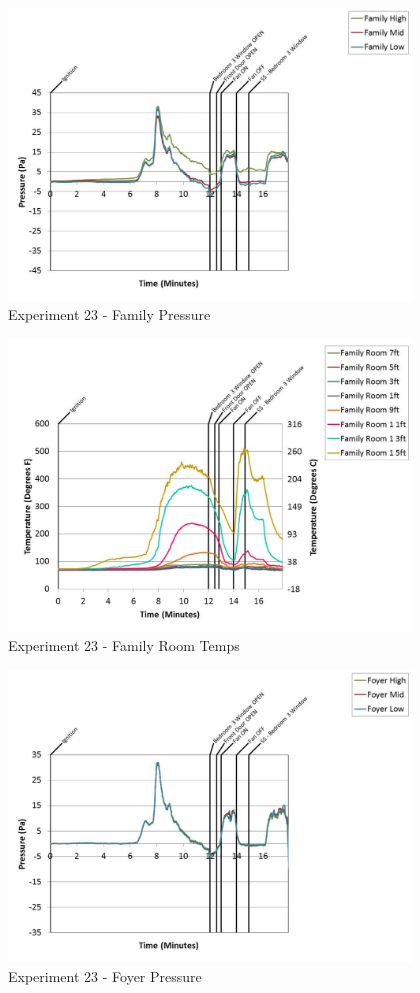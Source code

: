 \documentclass{article}
\begin{document}
\begin{appendices}
	\begin{figure}[h!]
		\centering
		\includegraphics[height=3.05in]{0_Images/Results_Charts/Exp_23_Charts/FamilyPressure.pdf}
		\caption{Experiment 23 - Family Pressure}
	\end{figure}
 
	\clearpage

	\begin{figure}[h!]
		\centering
		\includegraphics[height=3.05in]{0_Images/Results_Charts/Exp_23_Charts/FamilyRoomTemps.pdf}
		\caption{Experiment 23 - Family Room Temps}
	\end{figure}
 

	\begin{figure}[h!]
		\centering
		\includegraphics[height=3.05in]{0_Images/Results_Charts/Exp_23_Charts/FoyerPressure.pdf}
		\caption{Experiment 23 - Foyer Pressure}
	\end{figure}
 

\end{appendices}
\end{document}
